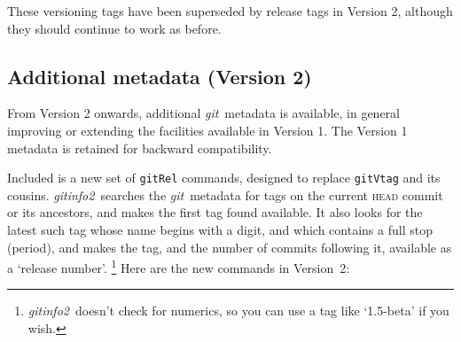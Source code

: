 \documentclass[a4paper,12pt,twoside,openany]{memoir}
\newcommand{\sfit}[1]{\textit{#1}}
\newcommand{\git}{\sfit{git}}
\newcommand{\tpname}{\sfit{gitinfo2}}
\begin{document}
These versioning tags have been superseded by release tags in Version 2,
although they should continue to work as before.

\subsection{Additional metadata (Version 2)}

From Version 2 onwards, additional \git\ metadata is available,
in general improving or extending the facilities available in Version 1.
The Version 1 metadata is retained for backward compatibility.

Included is a new set of \texttt{gitRel} commands,
designed to replace \texttt{gitVtag} and its cousins.
\tpname\ searches the \git\ metadata for tags
on the current \textsc{head} commit or its ancestors,
and makes the first tag found available.
It also looks for the latest such tag
whose name begins with a digit, and which contains a full stop (period),
and makes the tag, and the number of commits following it,
available as a `release number'.%
\footnote{\tpname\ doesn't check for numerics, so you can use a tag like `1.5-beta' if you wish.}
Here are the new commands in Version~2:
\end{document}
